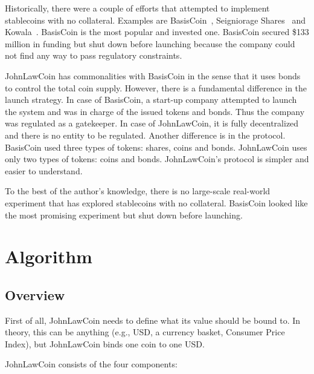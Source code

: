 \documentclass[dvipdfmx,a4paper]{article}
\begin{document}
Historically, there were a couple of efforts that attempted to implement stablecoins with no collateral. Examples are BasisCoin~\cite{basiscoin}, Seigniorage Shares~\cite{seigniorage} and Kowala~\cite{kowala}. BasisCoin is the most popular and invested one. BasisCoin secured \$133 million in funding but shut down before launching because the company could not find any way to pass regulatory constraints.

JohnLawCoin has commonalities with BasisCoin in the sense that it uses bonds to control the total coin supply. However, there is a fundamental difference in the launch strategy. In case of BasisCoin, a start-up company attempted to launch the system and was in charge of the issued tokens and bonds. Thus the company was regulated as a gatekeeper. In case of JohnLawCoin, it is fully decentralized and there is no entity to be regulated. Another difference is in the protocol. BasisCoin used three types of tokens: shares, coins and bonds. JohnLawCoin uses only two types of tokens: coins and bonds. JohnLawCoin's protocol is simpler and easier to understand.

To the best of the author's knowledge, there is no large-scale real-world experiment that has explored stablecoins with no collateral. BasisCoin looked like the most promising experiment but shut down before launching.

\section{Algorithm}

\subsection{Overview}

First of all, JohnLawCoin needs to define what its value should be bound to. In theory, this can be anything (e.g., USD, a currency basket, Consumer Price Index), but JohnLawCoin binds one coin to one USD.

JohnLawCoin consists of the four components:
\end{document}
